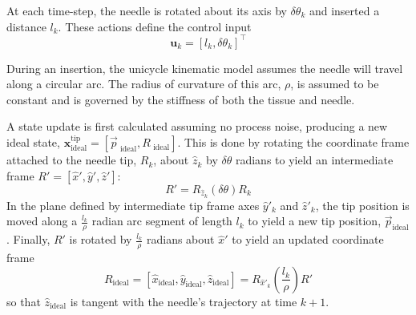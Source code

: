 \documentclass[journal,transmag]{IEEEtran}
\newcommand{\bvar}[2]{\mathbf{#1}_{#2}}
\newcommand{\unistate}[2]{\mathbf{#1}^{\text{tip}}_{#2}}
\begin{document}
At each time-step, the needle is rotated about its axis by $\delta \theta_k$ and inserted a distance $l_k$.  These actions define the control input 
\begin{equation*}
\bvar{u}{k} = \left[l_k, \delta\theta_k\right]^\top
\end{equation*}  

During an insertion, the unicycle kinematic model assumes the needle will travel along a circular arc.  The radius of curvature of this arc, $\rho$, is assumed to be constant and is governed by the stiffness of both the tissue and needle.  

A state update is first calculated assuming no process noise, producing a new ideal state, $\unistate{x}{\text{ideal}} = \left[\vec{p}_{\text{ ideal}}, R_{\text{ ideal}}\right]$.  This is done by rotating the coordinate frame attached to the needle tip, $R_k$, about $\hat{z}_k$ by $\delta \theta$ radians to yield an intermediate frame $R' = [\hat{x}', \hat{y}', \hat{z}']$:
\begin{equation*}
R' = R_{\hat{z}_k}(\delta\theta)R_k
\end{equation*}
In the plane defined by intermediate tip frame axes $\hat{y}'_k$ and $\hat{z}'_k$, the tip position is moved along a $\frac{l_k}{\rho}$ radian arc segment of length $l_k$ to yield a new tip position, $\vec{p}_{\text{ideal}}$.  Finally, $R'$ is rotated by $\frac{l_k}{\rho}$ radians about $\hat{x}'$ to yield an updated coordinate frame
\begin{equation*}
R_{\text{ideal}} = [\hat{x}_{\text{ideal}}, \hat{y}_{\text{ideal}}, \hat{z}_{\text{ideal}}] = R_{\hat{x}'_k}\left(\frac{l_k}{\rho}\right)R'
\end{equation*}
so that $\hat{z}_{\text{ideal}}$ is tangent with the needle's trajectory at time $k+1$.  
\end{document}
